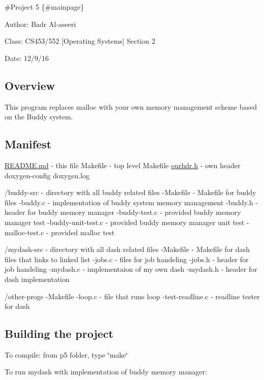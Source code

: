 \#\+Project 5 \{\#mainpage\}


\begin{DoxyItemize}
\item Author\+: Badr Al-\/aseeri
\item Class\+: C\+S453/552 \mbox{[}Operating Systems\mbox{]} Section 2
\item Date\+: 12/9/16 \subsection*{Overview}
\end{DoxyItemize}

This program replaces malloc with your own memory management scheme based on the Buddy system.

\subsection*{Manifest}

\hyperlink{README_8md}{R\+E\+A\+D\+M\+E.\+md} -\/ this file Makefile -\/ top level Makefile \hyperlink{ourhdr_8h}{ourhdr.\+h} -\/ own header doxygen-\/config doxygen.\+log

/buddy-\/src -\/ directory with all buddy related files -\/\+Makefile -\/ Makefile for buddy files -\/buddy.\+c -\/ implementation of buddy system memory management -\/buddy.\+h -\/ header for buddy memory manager -\/buddy-\/test.\+c -\/ provided buddy memory manager test -\/buddy-\/unit-\/test.\+c -\/ provided buddy memory manager unit test -\/malloc-\/test.\+c -\/ provided malloc test

/mydash-\/src -\/ directory with all dash related files -\/\+Makefile -\/ Makefile for dash files that links to linked list -\/jobs.\+c -\/ files for job handeling -\/jobs.\+h -\/ header for job handeling -\/mydash.\+c -\/ implementaion of my own dash -\/mydash.\+h -\/ header for dash implementation

/other-\/progs -\/\+Makefile -\/loop.\+c -\/ file that runs loop -\/test-\/readline.\+c -\/ readline tester for dash

\subsection*{Building the project}

To compile\+: from p5 folder, type \char`\"{}make\char`\"{}

To run mydash with implementation of buddy memory manager\+: 


